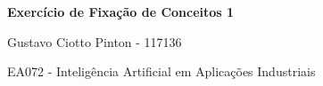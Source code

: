 \documentclass[12pt, a4paper]{article}
\author{Gustavo Ciotto Pinton}
\begin{document}
 
{\large 
    \centerline{\textbf{Exercício de Fixação de Conceitos 1}}
    \centerline{Gustavo Ciotto Pinton - 117136}
    \centerline{EA072 - Inteligência Artificial em Aplicações Industriais}
}










    
\end{document}
